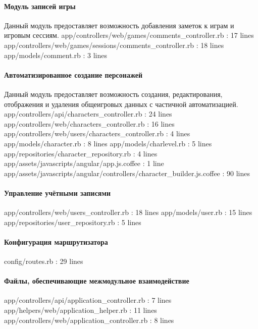 \paragraph{Модуль записей игры}

Данный модуль предоставляет возможность добавления заметок к играм и игровым сессиям.
app/controllers/web/games/comments\_controller.rb : 17 lines
app/controllers/web/games/sessions/comments\_controller.rb : 18 lines
app/models/comment.rb : 3 lines


\paragraph{Автоматизированное создание персонажей}

Данный модуль предоставляет возможность создания, редактирования, отображения и удаления общеигровых данных с частичной автоматизацией.
app/controllers/api/characters\_controller.rb : 24 lines
app/controllers/web/characters\_controller.rb : 16 lines
app/controllers/web/users/characters\_controller.rb : 4 lines
app/models/character.rb : 8 lines
app/models/charlevel.rb : 5 lines
app/repositories/character\_repository.rb : 4 lines
app/assets/javascripts/angular/app.js.coffee : 1 line
app/assets/javascripts/angular/controllers/character\_builder.js.coffee : 90 lines


\paragraph{Управление учётными записями}
app/controllers/web/users\_controller.rb : 18 lines
app/models/user.rb : 15 lines
app/repositories/user\_repository.rb : 5 lines

\paragraph{Конфигурация маршрутизатора}
config/routes.rb : 29 lines


\paragraph{Файлы, обеспечивающие межмодульное взаимодействие}
app/controllers/api/application\_controller.rb : 7 lines
app/helpers/web/application\_helper.rb : 11 lines
app/controllers/web/application\_controller.rb : 8 lines
